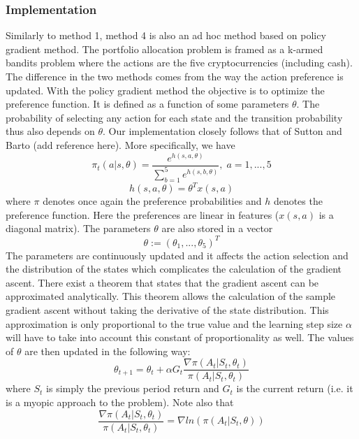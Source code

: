 \documentclass[a4paper,12pt]{article}
\begin{document}
\subsubsection{Implementation}
Similarly to method 1, method 4 is also an ad hoc method based on policy gradient method. The portfolio allocation problem is framed as a k-armed bandits problem where the actions are the five cryptocurrencies (including cash). The difference in the two methods comes from the way the action preference is updated.  With the policy gradient method the objective is to optimize the preference function. It is defined as a function of some parameters $\theta$. The probability of selecting any action for each state and the transition probability thus also depends on $\theta$. Our implementation closely follows that of Sutton and Barto (add reference here). More specifically, we have
\begin{equation}
\pi_t (a|s,\theta)  = \frac{e^{h(s,a,\theta)}}{\sum_{b=1}^{5} e^{h(s,b,\theta)}}, \; a=1,...,5
\end{equation}
\begin{equation}
h(s,a,\theta) = \theta^T x(s,a)
\end{equation}
where $\pi$ denotes once again the preference probabilities and $h$ denotes the preference function. Here the preferences are linear in features ($x(s,a)$ is a diagonal matrix). The parameters $\theta$ are also stored in a vector
\begin{equation}
\theta := (\theta_1,...,\theta_5)^T
\end{equation}
The parameters are continuously updated and it affects the action selection and the distribution of the states which complicates the calculation of the gradient ascent. There exist a theorem that states that the gradient ascent can be approximated analytically. This theorem allows the calculation of the sample gradient ascent without taking the derivative of the state distribution. This approximation is only proportional to the true value and the learning step size $\alpha$ will have to take into account this constant of proportionality as well. The values of $\theta$ are then updated in the following way:
\begin{equation}
\theta_{t+1} = \theta_t + \alpha G_t \frac{\nabla \pi(A_t | S_t,\theta_t)}{\pi(A_t | S_t,\theta_t)}
\end{equation}
where $S_t$ is simply the previous period return and $G_t$ is the current return (i.e. it is a myopic approach to the problem). Note also that 
\begin{equation}
\frac{\nabla \pi(A_t | S_t,\theta_t)}{\pi(A_t | S_t,\theta_t)} = \nabla ln(\pi(A_t|S_t,\theta))
\end{equation} \\
\end{document}
